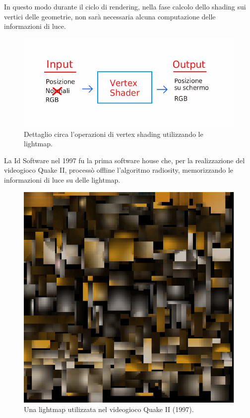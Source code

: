 In questo modo durante il ciclo di rendering, nella fase calcolo dello shading sui vertici delle geometrie, non sarà necessaria alcuna computazione delle informazioni di luce. 
\\
\begin{figure}[htb]
 \centering
 \includegraphics[width=0.8\linewidth]{images/chapter_stato_arte/stato_arte_ver_sh.jpg}\hfill
 \caption[Vertex shading lightmap]{Dettaglio circa l'operazioni di vertex shading utilizzando le lightmap.}
 \label{fig:stato_arte_ver_sh}
\end{figure}

La Id Software nel 1997 fu la prima 
software house che, per la realizzazione del videogioco Quake II, processò offline l’algoritmo radiosity, memorizzando le informazioni di luce su delle lightmap.
\\
\begin{figure}[htb]
 \centering
 \includegraphics[width=0.5\linewidth]{images/chapter_stato_arte/stato_arte_quake_lightmap.png}\hfill
 \caption[Lightmap Quake II]{Una lightmap utilizzata nel videogioco Quake II (1997).}
 \label{fig:stato_arte_quake_lightmap}
\end{figure}

